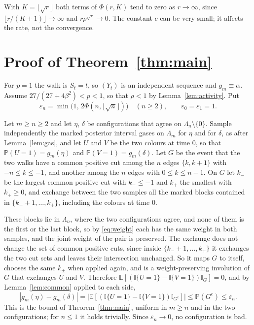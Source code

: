 \documentclass[11pt]{amsart}
\theoremstyle{remark}
\newcommand{\PP}{\mathbb{P}}
\newcommand{\E}{\mathbb{E}}
\newcommand{\I}{\mathbb{I}}
\begin{document}
With $K=\lfloor\sqrt r\rfloor$ both terms of $\Phi(r,K)$ tend to zero as $r\to\infty$, since $\lfloor r/(K+1)\rfloor\to\infty$
and $r\rho^{\sqrt r}\to0$. The constant $c$ can be very small; it affects the rate, not the convergence.

\section{Proof of Theorem~\ref{thm:main}}\label{sec:proof}

For $p=1$ the walk is $S_t=t$, so $(Y_t)$ is an independent sequence and $g_m\equiv\alpha$. Assume
$27/(27+4\beta^2)<p<1$, so that $\rho<1$ by Lemma~\ref{lem:activity}. Put
\begin{equation}\label{eq:modulus}
\varepsilon_n=\min\bigl(1,\,2\Phi(n,\lfloor\sqrt n\rfloor)\bigr)\quad(n\ge2),\qquad\varepsilon_0=\varepsilon_1=1 .
\end{equation}

Let $m\ge n\ge2$ and let $\eta$, $\delta$ be configurations that agree on $\Lambda_n\setminus\{0\}$. Sample
independently the marked posterior interval gases on $\Lambda_m$ for $\eta$ and for $\delta$, as after
Lemma~\ref{lem:gas}, and let $U$ and $V$ be the two colours at time $0$, so that $\PP(U=1)=g_m(\eta)$ and
$\PP(V=1)=g_m(\delta)$. Let $G$ be the event that the two walks have a common positive cut among the $n$ edges
$\{k,k+1\}$ with $-n\le k\le-1$, and another among the $n$ edges with $0\le k\le n-1$. On $G$ let $k_-$ be the largest
common positive cut with $k_-\le-1$ and $k_+$ the smallest with $k_+\ge0$, and exchange between the two samples all the
marked blocks contained in $\{k_-+1,\dots,k_+\}$, including the colours at time $0$.

These blocks lie in $\Lambda_n$, where the two configurations agree, and none of them is the first or the last block,
so by \eqref{eq:weight} each has the same weight in both samples, and the joint weight of the pair is preserved. The
exchange does not change the set of common positive cuts, since inside $\{k_-+1,\dots,k_+\}$ it exchanges the two cut
sets and leaves their intersection unchanged. So it maps $G$ to itself, chooses the same $k_\pm$ when applied again, and
is a weight-preserving involution of $G$ that exchanges $U$ and $V$. Therefore
$\E[(\I\{U=1\}-\I\{V=1\})\I_G]=0$, and by Lemma~\ref{lem:common} applied to each side,
\[
|g_m(\eta)-g_m(\delta)|=\bigl|\E[(\I\{U=1\}-\I\{V=1\})\I_{G^c}]\bigr|\le\PP(G^c)\le\varepsilon_n .
\]
This is the bound of Theorem~\ref{thm:main}, uniform in $m\ge n$ and in the two configurations; for $n\le1$ it holds
trivially. Since $\varepsilon_n\to0$, no configuration is bad.
\end{document}
